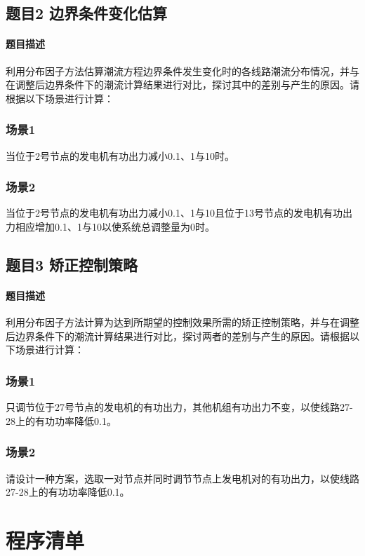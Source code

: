 \documentclass[a4paper,12pt]{article}
\begin{document}
    \subsection{题目2 边界条件变化估算}
    \paragraph{题目描述} 利用分布因子方法估算潮流方程边界条件发生变化时的各线路潮流分布情况，并与在调整后边界条件下的潮流计算结果进行对比，探讨其中的差别与产生的原因。请根据以下场景进行计算：
    \subsubsection{场景1} 当位于2号节点的发电机有功出力减小0.1、1与10时。
    \subsubsection{场景2} 当位于2号节点的发电机有功出力减小0.1、1与10且位于13号节点的发电机有功出力相应增加0.1、1与10以使系统总调整量为0时。

    \subsection{题目3 矫正控制策略}
    \paragraph{题目描述} 利用分布因子方法计算为达到所期望的控制效果所需的矫正控制策略，并与在调整后边界条件下的潮流计算结果进行对比，探讨两者的差别与产生的原因。请根据以下场景进行计算：
    \subsubsection{场景1} 只调节位于27号节点的发电机的有功出力，其他机组有功出力不变，以使线路27-28上的有功功率降低0.1。
    \subsubsection{场景2} 请设计一种方案，选取一对节点并同时调节节点上发电机对的有功出力，以使线路27-28上的有功功率降低0.1。

    
    
    \appendix
    \section{程序清单}
      
    \label{applastpage}
\iffalse
\begin{itemize}[noitemsep,topsep=0pt]
\end{itemize}
\begin{enumerate}[label=\Roman{*}.,noitemsep,topsep=0pt]
\end{enumerate}
\begin{multicols}{2}
\end{multicols}
\fi
\end{document}
